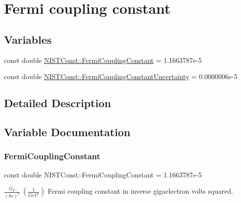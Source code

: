 \hypertarget{group___n_i_s_t_const-_fermi_coupling_constant}{}\section{Fermi coupling constant}
\label{group___n_i_s_t_const-_fermi_coupling_constant}
\subsection*{Variables}
\begin{DoxyCompactItemize}
\item 
const double \hyperlink{group___n_i_s_t_const-_fermi_coupling_constant_ga0348e7c9835697c05fa7f68029bfb15a}{N\+I\+S\+T\+Const\+::\+Fermi\+Coupling\+Constant} = 1.\+1663787e-\/5
\item 
const double \hyperlink{group___n_i_s_t_const-_fermi_coupling_constant_gaf419e34a813e9b1aeeddc54937905aa0}{N\+I\+S\+T\+Const\+::\+Fermi\+Coupling\+Constant\+Uncertainty} = 0.\+0000006e-\/5
\end{DoxyCompactItemize}


\subsection{Detailed Description}


\subsection{Variable Documentation}
\mbox{\label{group___n_i_s_t_const-_fermi_coupling_constant_ga0348e7c9835697c05fa7f68029bfb15a}} 
\subsubsection{\texorpdfstring{Fermi\+Coupling\+Constant}{FermiCouplingConstant}}
{\footnotesize\ttfamily const double N\+I\+S\+T\+Const\+::\+Fermi\+Coupling\+Constant = 1.\+1663787e-\/5}

$\frac{G_F}{(\hbar c)^3} \ (\frac{1}{GeV^2})$ Fermi coupling constant in inverse gigaelectron volts squared. \mbox{\label{group___n_i_s_t_const-_fermi_coupling_constant_gaf419e34a813e9b1aeeddc54937905aa0}} 
